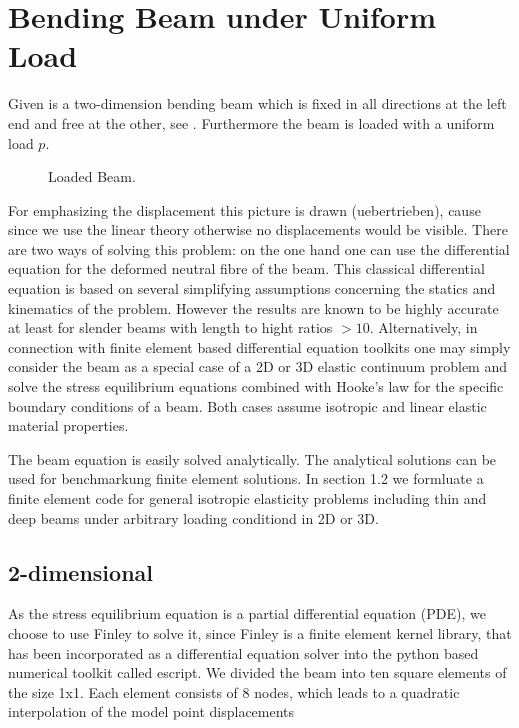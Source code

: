 \chapter{Bending Beam under Uniform Load}
\label{BEAM CHAP}

Given is a two-dimension bending beam which is fixed in all directions
at the left end and free at the other, see . Furthermore the beam is loaded
with a uniform load $p$.

\begin{figure}
\caption{Loaded Beam.}
\label{BEAM FIG 1}
\end{figure}



For emphasizing the displacement this picture is drawn (uebertrieben),
cause since we use the linear theory otherwise no displacements would
be visible. 
There are two ways of solving this problem: on the one hand one can
use the differential equation for the deformed neutral fibre of the
beam. This classical differential equation is based on several simplifying
assumptions concerning the statics and kinematics of the problem.
However the results are known to be highly accurate at least for slender
beams with length to hight ratios $> 10$. Alternatively, in connection
with finite element based differential equation toolkits one may simply
consider the beam as a special case of a 2D or 3D elastic continuum
problem and solve the stress equilibrium equations combined with Hooke's
law for the specific boundary conditions of a beam. Both cases assume
isotropic and linear elastic material properties.

The beam equation is easily solved analytically. The analytical solutions
can be used for benchmarkung finite element solutions. In section
1.2 we formluate a finite element code for general isotropic elasticity
problems including thin and deep beams under arbitrary loading conditiond
in 2D or 3D. 


\section{2-dimensional}
As the stress equilibrium equation is a partial differential equation
(PDE), we choose to use Finley to solve it, since Finley is a finite
element kernel library, that has been incorporated as a differential
equation solver into the python based numerical toolkit called escript.
We divided the beam into ten square elements of the size 1x1. Each
element consists of 8 nodes, which leads to a quadratic interpolation
of the model point displacements \\

